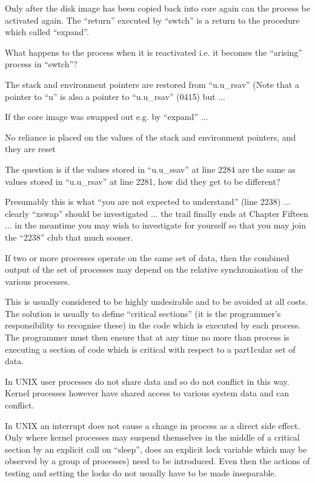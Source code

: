 Only after the disk image has
been copied back into core again
can the process be activated
again. The ``return'' executed by
``swtch'' is a return to the procedure which called ``expand''.


What happens to the process when it is
reactivated i.e. it becomes the ``arising'' process in ``swtch''?

\bd
\item[2228:] The stack and environment
 pointers are restored from
 ``u.u\_rsav'' (Note that a pointer
 to ``u'' is also a pointer to
 ``u.u\_rsav'' (0415) but ...

\item[2240:] If the core image was swapped
 out e.g. by ``expand'' ...

\item[2242:] No reliance is placed on the
 values of the stack and environment pointers, and they are reset
\ed


The question is if the values stored
in ``u.u\_ssav'' at line 2284 are the same
as values stored in ``u.u\_rsav'' at line
2281, how did they get to be different?


Presumably this is what ``you are not
expected to understand'' (line 2238) ...
clearly ``xswap'' should be investigated
... the trail finally ends at Chapter
Fifteen ... in the meantime you may
wish to investigate for yourself so
that you may join the ``2238'' club that
much sooner.


If two or more processes operate on the
same set of data, then the combined
output of the set of processes may
depend on the relative synchronisation
of the various processes.

This is usually considered to be highly
undesirable and to be avoided at all
costs. The solution is usually to
define ``critical sections'' (it is the
programmer's responsibility to recognise these) in the code which is executed by each process. The programmer
must then ensure that at any time no
more than process is executing a
section of code which is critical with
respect to a part1cular set of data.

In UNIX user processes do not share
data and so do not conflict in this
way. Kernel processes however have
shared access to various system data
and can conflict.

In UNIX an interrupt does not cause a
change in process as a direct side
effect. Only where kernel processes
may suspend themselves in the middle of
a critical section by an explicit call
on ``sleep'', does an explicit lock variable which may be observed by a group
of processes) need to be introduced.
Even then the actions of testing and
setting the locks do not usually have
to be made inseparable.

